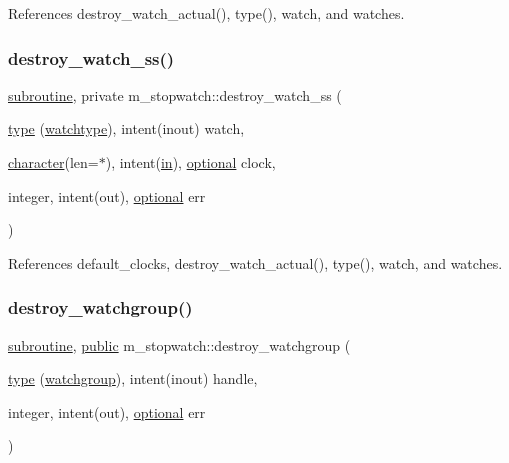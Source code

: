 References destroy\+\_\+watch\+\_\+actual(), type(), watch, and watches.

\mbox{\label{namespacem__stopwatch_a52d004e036a839d4513629cc4cb158c7}} 
\subsubsection{\texorpdfstring{destroy\+\_\+watch\+\_\+ss()}{destroy\_watch\_ss()}}
{\footnotesize\ttfamily \hyperlink{M__stopwatch_83_8txt_acfbcff50169d691ff02d4a123ed70482}{subroutine}, private m\+\_\+stopwatch\+::destroy\+\_\+watch\+\_\+ss (\begin{DoxyParamCaption}\item[{\hyperlink{stop__watch_83_8txt_a70f0ead91c32e25323c03265aa302c1c}{type} (\hyperlink{structm__stopwatch_1_1watchtype}{watchtype}), intent(inout)}]{watch,  }\item[{\hyperlink{option__stopwatch_83_8txt_abd4b21fbbd175834027b5224bfe97e66}{character}(len=$\ast$), intent(\hyperlink{M__journal_83_8txt_afce72651d1eed785a2132bee863b2f38}{in}), \hyperlink{option__stopwatch_83_8txt_aa4ece75e7acf58a4843f70fe18c3ade5}{optional}}]{clock,  }\item[{integer, intent(out), \hyperlink{option__stopwatch_83_8txt_aa4ece75e7acf58a4843f70fe18c3ade5}{optional}}]{err }\end{DoxyParamCaption})\hspace{0.3cm}{\ttfamily [private]}}



References default\+\_\+clocks, destroy\+\_\+watch\+\_\+actual(), type(), watch, and watches.

\mbox{\label{namespacem__stopwatch_a5441e214dd82a2356ed4f4fe892cbb51}} 
\subsubsection{\texorpdfstring{destroy\+\_\+watchgroup()}{destroy\_watchgroup()}}
{\footnotesize\ttfamily \hyperlink{M__stopwatch_83_8txt_acfbcff50169d691ff02d4a123ed70482}{subroutine}, \hyperlink{M__stopwatch_83_8txt_a2f74811300c361e53b430611a7d1769f}{public} m\+\_\+stopwatch\+::destroy\+\_\+watchgroup (\begin{DoxyParamCaption}\item[{\hyperlink{stop__watch_83_8txt_a70f0ead91c32e25323c03265aa302c1c}{type} (\hyperlink{structm__stopwatch_1_1watchgroup}{watchgroup}), intent(inout)}]{handle,  }\item[{integer, intent(out), \hyperlink{option__stopwatch_83_8txt_aa4ece75e7acf58a4843f70fe18c3ade5}{optional}}]{err }\end{DoxyParamCaption})}



